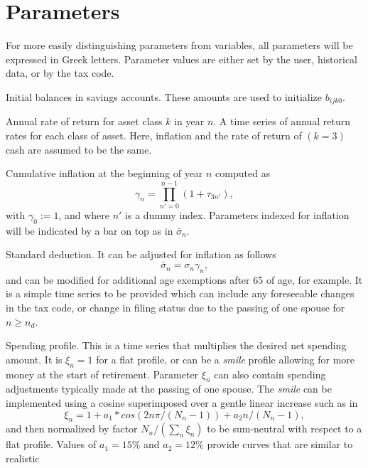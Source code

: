 \documentclass{report}[fleqn,12pt]
\begin{document}
\section{Parameters}
For more easily distinguishing parameters from variables, all parameters will be expressed in Greek letters.
Parameter values are either set by the user, historical data, or by the tax code.
\begin{description}[leftmargin=4em,style=multiline]
\item [$\beta{ij}$]
	Initial balances in savings accounts. These amounts are used to initialize $b_{ijk0}$.
\item [$\tau_{kn}$]
	Annual rate of return for asset class $k$ in year $n$.
	A time series of annual return rates for each class of asset.
	Here, inflation and the rate of return of $(k=3)$ cash are assumed to be the same.
\item [$\gamma_n$]
	Cumulative inflation at the beginning of year $n$ computed as
	\begin{equation}
		\gamma_n = \prod_{n' = 0}^{n-1} (1 + \tau_{3n'}),
	\end{equation}
	with $\gamma_0 := 1$, and where $n'$ is a dummy index.
	Parameters indexed for inflation will be indicated by a bar on top as in $\bar\sigma_n$.
\item [$\sigma_n$]
	Standard deduction. It can be adjusted for inflation as follows
	\begin{equation}
		\bar\sigma_n = \sigma_n \gamma_n,
	\end{equation}
	and can be modified for additional age exemptions after 65 of age, for example.
	It is a simple time series to be provided
	which can include any foreseeable changes in the tax code, or change in filing status due to the
	passing of one spouse for $n\ge n_d$.
\item [$\xi_{n}$]
	Spending profile. This is a time series that multiplies the desired net spending amount.
	It is $\xi_n =1$ for
	a flat profile, or can be a {\em smile} profile allowing for more money at the start
	of retirement. Parameter
	$\xi_n$ can also contain spending adjustments typically made at the passing of one spouse.
	The {\em smile} can be implemented using a cosine superimposed over a gentle linear increase
	such as in
	\begin{equation}
		\xi_n = 1 + a_1*cos(2n\pi/(N_n-1)) + a_2n/(N_n-1),
	\end{equation}
	and then normalized by factor $N_n/(\sum_n \xi_n )$ to be sum-neutral with respect to a flat profile.
	Values of $a_1 = 15\%$ and $a_2=12\%$ provide curves that are similar to realistic

\end{description}
\end{document}
